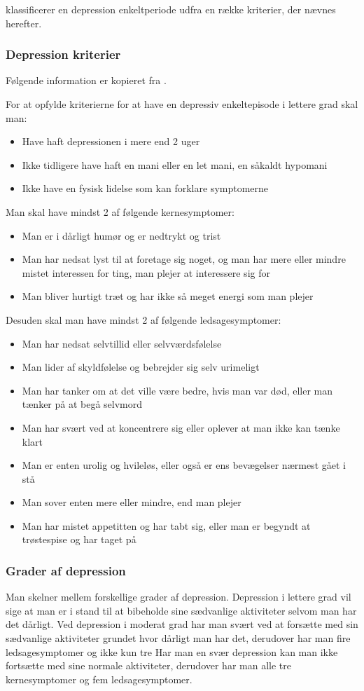 \citet{misc:netpsykdepression} klassificerer en depression enkeltperiode udfra en række kriterier, der nævnes herefter.
\subsubsection{Depression kriterier}
Følgende information er kopieret fra \citet{misc:netpsykdepression}.

For at opfylde kriterierne for at have en depressiv enkeltepisode i lettere grad skal man:
\begin{itemize}
	\item Have haft depressionen i mere end 2 uger
	\item Ikke tidligere have haft en mani eller en let mani, en såkaldt hypomani
	\item Ikke have en fysisk lidelse som kan forklare symptomerne
\end{itemize}
Man skal have mindst 2 af følgende kernesymptomer:
\begin{itemize}
	\item Man er i dårligt humør og er nedtrykt og trist
	\item Man har nedsat lyst til at foretage sig noget, og man har mere eller mindre mistet interessen for ting, man plejer at interessere sig for
	\item Man bliver hurtigt træt og har ikke så meget energi som man plejer
\end{itemize}
Desuden skal man have mindst 2 af følgende ledsagesymptomer:
\begin{itemize}
	\item Man har nedsat selvtillid eller selvværdsfølelse
	\item Man lider af skyldfølelse og bebrejder sig selv urimeligt
	\item Man har tanker om at det ville være bedre, hvis man var død, eller man tænker på at begå selvmord
	\item Man har svært ved at koncentrere sig eller oplever at man ikke kan tænke klart
	\item Man er enten urolig og hvileløs, eller også er ens bevægelser nærmest gået i stå
	\item Man sover enten mere eller mindre, end man plejer
	\item Man har mistet appetitten og har tabt sig, eller man er begyndt at trøstespise og har taget på
\end{itemize}

\subsubsection{Grader af depression}
Man skelner mellem forskellige grader af depression.
Depression i lettere grad vil sige at man er i stand til at bibeholde sine sædvanlige aktiviteter selvom man har det dårligt.
Ved depression i moderat grad har man svært ved at forsætte med sin sædvanlige aktiviteter grundet hvor dårligt man har det, derudover har man fire ledsagesymptomer og ikke kun tre
Har man en svær depression kan man ikke fortsætte med sine normale aktiviteter, derudover har man alle tre kernesymptomer og fem ledsagesymptomer.


